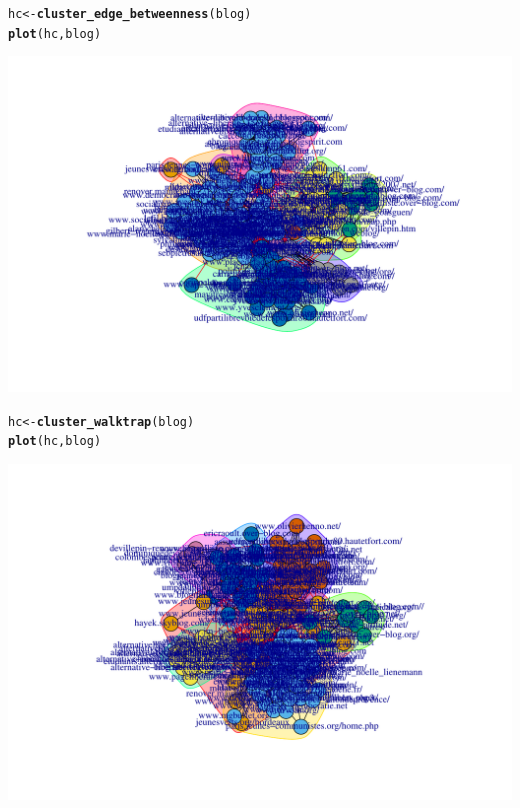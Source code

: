 \documentclass{beamer}\usepackage[]{graphicx}\usepackage[]{color}
\makeatletter
\newcommand{\hlstd}[1]{\textcolor[rgb]{0.345,0.345,0.345}{#1}}%
\newcommand{\hlkwb}[1]{\textcolor[rgb]{0.69,0.353,0.396}{#1}}%
\newcommand{\hlkwd}[1]{\textcolor[rgb]{0.737,0.353,0.396}{\textbf{#1}}}%
\newenvironment{kframe}{%
 \def\at@end@of@kframe{}%
 \ifinner\ifhmode%
  \def\at@end@of@kframe{\end{minipage}}%
  \begin{minipage}{\columnwidth}%
 \fi\fi%
 \def\FrameCommand##1{\hskip\@totalleftmargin \hskip-\fboxsep
 \colorbox{shadecolor}{##1}\hskip-\fboxsep
     \hskip-\linewidth \hskip-\@totalleftmargin \hskip\columnwidth}%
 \MakeFramed {\advance\hsize-\width
   \@totalleftmargin\z@ \linewidth\hsize
   \@setminipage}}%
 {\par\unskip\endMakeFramed%
 \at@end@of@kframe}
\newenvironment{knitrout}{}{} %
\makeatother
\begin{document}
\begin{frame}
\begin{knitrout}\scriptsize
{}\color{fgcolor}\begin{kframe}
\begin{alltt}
\hlstd{hc} \hlkwb{<-} \hlkwd{cluster_edge_betweenness}\hlstd{(blog)}
\hlkwd{plot}\hlstd{(hc, blog)}
\end{alltt}
\end{kframe}
\includegraphics[width=.8\textwidth]{figures/unnamed-chunk-4-1} 
\end{knitrout}

\begin{knitrout}\scriptsize
{}\color{fgcolor}\begin{kframe}
\begin{alltt}
\hlstd{hc} \hlkwb{<-} \hlkwd{cluster_walktrap}\hlstd{(blog)}
\hlkwd{plot}\hlstd{(hc, blog)}
\end{alltt}
\end{kframe}
\includegraphics[width=.8\textwidth]{figures/unnamed-chunk-5-1} 
\end{knitrout}

\end{frame}
\end{document}
